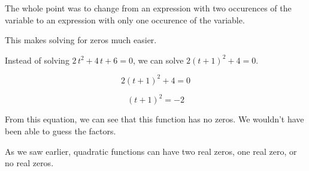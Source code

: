 \documentclass{ximera}
\begin{document}
The whole point was to change from an expression with two occurences of the variable to an expression with only one occurence of the variable. 

This makes solving for zeros much easier. 

Instead of solving $2 \, t^2 + 4 \, t + 6 = 0$, we can solve $2 (t+1)^2 + 4 = 0$.


\[
2 (t+1)^2 + 4 = 0
\]


\[
(t+1)^2 = -2
\]


From this equation, we can see that this function has no zeros. We wouldn't have been able to guess the factors. 


As we saw earlier, quadratic functions can have two real zeros, one real zero, or no real zeros. 
\end{document}
